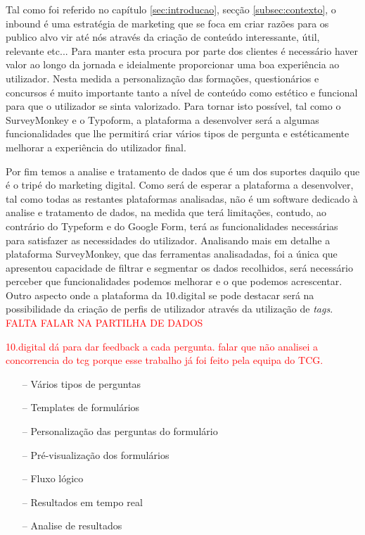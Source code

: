 Tal como foi referido no capítulo \ref{sec:introducao}, secção \ref{subsec:contexto}, o inbound é uma estratégia de marketing que se foca em criar razões para os publico alvo vir até nós através da criação de conteúdo interessante, útil, relevante etc... Para manter esta procura por parte dos clientes é necessário haver valor ao longo da jornada e ideialmente proporcionar uma boa experiência ao utilizador. Nesta medida a personalização das formações, questionários e concursos é muito importante tanto a nível de conteúdo como estético e funcional para que o utilizador se sinta valorizado. Para tornar isto possível, tal como o SurveyMonkey e o Typoform, a plataforma a desenvolver será a algumas funcionalidades que lhe permitirá criar vários tipos de pergunta e estéticamente melhorar a experiência do utilizador final.



Por fim temos a analise e tratamento de dados que é um dos suportes daquilo que é o tripé do marketing digital. Como será de esperar a plataforma a desenvolver, tal como todas as restantes plataformas analisadas, não é um software dedicado à analise e tratamento de dados, na medida que terá limitações, contudo, ao contrário do Typeform e do Google Form, terá as funcionalidades necessárias para satisfazer as necessidades do utilizador. Analisando mais em detalhe a plataforma SurveyMonkey, que das ferramentas analisadadas, foi a única que apresentou capacidade de filtrar e segmentar os dados recolhidos, será necessário perceber que funcionalidades podemos melhorar e o que podemos acrescentar. Outro aspecto onde a plataforma da 10.digital se pode destacar será na possibilidade da criação de perfis de utilizador através da utilização de \textit{tags}. 
\textcolor{red}{ FALTA FALAR NA PARTILHA DE DADOS}

\textcolor{red}{
10.digital dá para dar feedback a cada pergunta.
falar que não analisei a concorrencia do tcg porque esse trabalho já foi feito pela equipa do TCG.
}


\begin{itemize}
	\item[--] Vários tipos de perguntas
	\item[--] Templates de formulários
	\item[--] Personalização das perguntas do formulário
	\item[--] Pré-visualização dos formulários
	\item[--] Fluxo lógico
	\item[--] Resultados em tempo real
	\item[--] Analise de resultados
\end{itemize}

